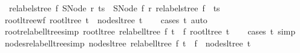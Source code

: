 \begin{isabellebody}
\ \ {\isachardoublequoteopen}relabel{\isacharunderscore}{\kern0pt}stree\ f\ {\isacharparenleft}{\kern0pt}SNode\ r\ ts{\isacharparenright}{\kern0pt}\ {\isacharequal}{\kern0pt}\ SNode\ {\isacharparenleft}{\kern0pt}f\ r{\isacharparenright}{\kern0pt}\ {\isacharparenleft}{\kern0pt}{\isacharparenleft}{\kern0pt}relabel{\isacharunderscore}{\kern0pt}stree\ f{\isacharparenright}{\kern0pt}\ {\isacharbar}{\kern0pt}{\isacharbackquote}{\kern0pt}{\isacharbar}{\kern0pt}\ ts{\isacharparenright}{\kern0pt}{\isachardoublequoteclose}%
\isadelimdocument
%
\endisadelimdocument
%
\isatagdocument
%
\isamarkuptrue%
%
\endisatagdocument
{\isafolddocument}%
%
\isadelimdocument
%
\endisadelimdocument
{}\isamarkupfalse%
\ root{\isacharunderscore}{\kern0pt}ltree{\isacharunderscore}{\kern0pt}wf{\isacharcolon}{\kern0pt}\ {\isachardoublequoteopen}root{\isacharunderscore}{\kern0pt}ltree\ t\ {\isasymin}\ nodes{\isacharunderscore}{\kern0pt}ltree\ t{\isachardoublequoteclose}\isanewline
%
\isadelimproof
\ \ %
\endisadelimproof
%
\isatagproof
{}\isamarkupfalse%
\ {\isacharparenleft}{\kern0pt}cases\ t{\isacharparenright}{\kern0pt}\ auto%
\endisatagproof
{\isafoldproof}%
%
\isadelimproof
\isanewline
%
\endisadelimproof
\isanewline
{}\isamarkupfalse%
\ root{\isacharunderscore}{\kern0pt}relabel{\isacharunderscore}{\kern0pt}ltree{\isacharbrackleft}{\kern0pt}simp{\isacharbrackright}{\kern0pt}{\isacharcolon}{\kern0pt}\ {\isachardoublequoteopen}root{\isacharunderscore}{\kern0pt}ltree\ {\isacharparenleft}{\kern0pt}relabel{\isacharunderscore}{\kern0pt}ltree\ f\ t{\isacharparenright}{\kern0pt}\ {\isacharequal}{\kern0pt}\ f\ {\isacharparenleft}{\kern0pt}root{\isacharunderscore}{\kern0pt}ltree\ t{\isacharparenright}{\kern0pt}{\isachardoublequoteclose}\isanewline
%
\isadelimproof
\ \ %
\endisadelimproof
%
\isatagproof
{}\isamarkupfalse%
\ {\isacharparenleft}{\kern0pt}cases\ t{\isacharparenright}{\kern0pt}\ simp%
\endisatagproof
{\isafoldproof}%
%
\isadelimproof
\isanewline
%
\endisadelimproof
\isanewline
{}\isamarkupfalse%
\ nodes{\isacharunderscore}{\kern0pt}relabel{\isacharunderscore}{\kern0pt}ltree{\isacharbrackleft}{\kern0pt}simp{\isacharbrackright}{\kern0pt}{\isacharcolon}{\kern0pt}\ {\isachardoublequoteopen}nodes{\isacharunderscore}{\kern0pt}ltree\ {\isacharparenleft}{\kern0pt}relabel{\isacharunderscore}{\kern0pt}ltree\ f\ t{\isacharparenright}{\kern0pt}\ {\isacharequal}{\kern0pt}\ f\ {\isacharbackquote}{\kern0pt}\ nodes{\isacharunderscore}{\kern0pt}ltree\ t{\isachardoublequoteclose}\isanewline

\end{isabellebody}
